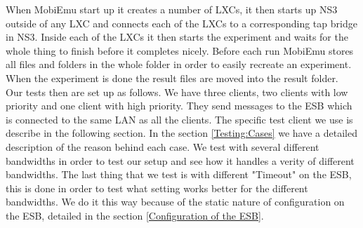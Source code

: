     When MobiEmu start up it creates a number of LXCs, it then starts up NS3 outside of any LXC and connects each of the LXCs to a corresponding tap bridge in NS3. Inside each of the LXCs it then starts the experiment and waits for the whole thing to finish before it completes nicely. Before each run MobiEmu stores all files and folders in the whole folder in order to easily recreate an experiment. When the experiment is done the result files are moved into the result folder. \\
    
    Our tests then are set up as follows. We have three clients, two clients with low priority and one client with high priority. They send messages to the ESB which is connected to the same LAN as all the clients. The specific test client we use is describe in the following section. In the section \ref{Testing:Cases} we have a detailed description of the reason behind each case. We test with several different bandwidths in order to test our setup and see how it handles a verity of different bandwidths. The last thing that we test is with different "Timeout" on the ESB, this is done in order to test what setting works better for the different bandwidths. We do it this way because of the static nature of configuration on the ESB, detailed in the section \ref{Configuration of the ESB}.
